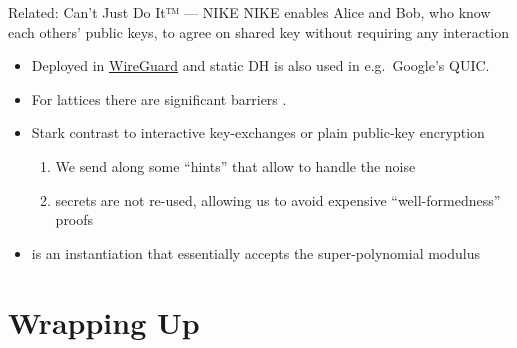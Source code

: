\documentclass[xcolor=table,10pt,aspectratio=169]{beamer}
\begin{document}
\begin{frame}[label={sec:orgf0149f2}]{Related: Can't Just Do It™ — NIKE}
NIKE enables Alice and Bob, who know each others’ public keys, to agree on shared key without requiring any interaction \cite{DifHel76}
\begin{itemize}
\item Deployed in \href{https://www.wireguard.com/}{WireGuard} \cite{EPRINT:HNSWZ20} and static DH is also used in e.g. Google’s QUIC.
\item For lattices there are significant barriers \cite{PKC:GKRS20}.
\item Stark contrast to \alert{interactive} key-exchanges or plain public-key encryption
\begin{enumerate}
\item We send along some “hints” that allow to handle the noise
\item secrets are not re-used, allowing us to avoid expensive “well-formedness” proofs
\end{enumerate}
\item \cite{USENIX:GKQMS24} is an instantiation that essentially accepts the super-polynomial modulus
\end{itemize}
\end{frame}
\section{Wrapping Up}
\label{sec:orge826d69}
\end{document}
